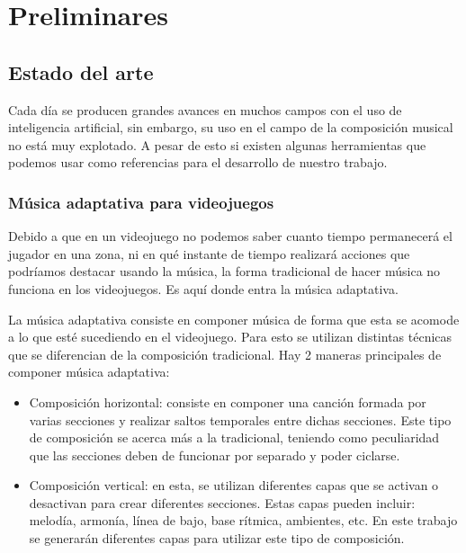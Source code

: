 \chapter{Preliminares}

\section{Estado del arte}

Cada día se producen grandes avances en muchos campos con el uso de inteligencia artificial, sin embargo, su uso en el campo de la composición musical no está muy explotado. A pesar de esto si existen algunas herramientas que podemos usar como referencias para el desarrollo de nuestro trabajo.

\subsection{Música adaptativa para videojuegos}

Debido a que en un videojuego no podemos saber cuanto tiempo permanecerá el jugador en una zona, ni en qué instante de tiempo realizará acciones que podríamos destacar usando la música, la forma tradicional de hacer música no funciona en los videojuegos. Es aquí donde entra la música adaptativa.

La música adaptativa consiste en componer música de forma que esta se acomode a lo que esté sucediendo en el videojuego. Para esto se utilizan distintas técnicas que se diferencian de la composición tradicional. Hay 2 maneras principales de componer música adaptativa:
\begin{itemize}
    \item Composición horizontal: consiste en componer una canción formada por varias secciones y realizar saltos temporales entre dichas secciones. Este tipo de composición se acerca más a la tradicional, teniendo como peculiaridad que las secciones deben de funcionar por separado y poder ciclarse. 
    \item Composición vertical: en esta, se utilizan diferentes capas que se activan o desactivan para crear diferentes secciones. Estas capas pueden incluir: melodía, armonía, línea de bajo, base rítmica, ambientes, etc. En este trabajo se generarán diferentes capas para utilizar este tipo de composición.
\end{itemize}

